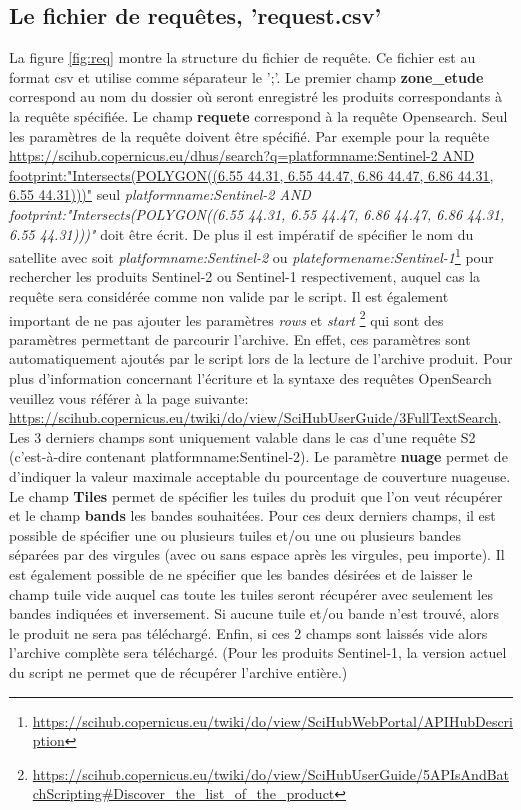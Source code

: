 \documentclass[notitlepage]{report}
\begin{document}
\subsection{Le fichier de requêtes, 'request.csv'}

\sloppypar
La figure \ref{fig:req} montre la structure du fichier de requête. Ce fichier est au format csv et utilise comme séparateur le ';'. Le premier champ \textbf{zone\_etude} correspond au nom du dossier où seront enregistré les produits correspondants à la requête spécifiée. Le champ \textbf{requete} correspond à la requête Opensearch. Seul les paramètres de la requête  doivent être spécifié. Par exemple pour la requête \url{https://scihub.copernicus.eu/dhus/search?q=platformname:Sentinel-2 AND footprint:"Intersects(POLYGON((6.55 44.31, 6.55 44.47, 6.86 44.47, 6.86 44.31, 6.55 44.31)))"} seul \emph{platformname:Sentinel-2 AND footprint:"Intersects(POLYGON((6.55 44.31, 6.55 44.47, 6.86 44.47, 6.86 44.31, 6.55 44.31)))"} doit être écrit. De plus il est impératif de spécifier le nom du satellite avec soit \emph{platformname:Sentinel-2} ou \emph{plateformename:Sentinel-1}\footnote{\url{https://scihub.copernicus.eu/twiki/do/view/SciHubWebPortal/APIHubDescription}} pour rechercher les produits Sentinel-2 ou Sentinel-1 respectivement, auquel cas la requête sera considérée comme non valide par le script. Il est également important de ne pas ajouter les paramètres \emph{rows} et \emph{start}
\footnote{\url{https://scihub.copernicus.eu/twiki/do/view/SciHubUserGuide/5APIsAndBatchScripting\#Discover_the_list_of_the_product}} qui sont des paramètres permettant de parcourir l'archive. En effet, ces paramètres sont automatiquement ajoutés par le script lors de la lecture de l'archive produit. Pour plus d'information concernant l'écriture et la syntaxe des requêtes OpenSearch veuillez vous référer à la page suivante: \url{https://scihub.copernicus.eu/twiki/do/view/SciHubUserGuide/3FullTextSearch}.
Les 3 derniers champs sont uniquement valable dans le cas d'une requête S2 (c'est-à-dire contenant platformname:Sentinel-2). Le paramètre \textbf{nuage} permet de d'indiquer la valeur maximale acceptable du pourcentage de couverture nuageuse. Le champ \textbf{Tiles} permet de spécifier les tuiles du produit que l'on veut récupérer et le champ \textbf{bands} les bandes souhaitées. Pour ces deux derniers champs, il est possible de spécifier une ou plusieurs tuiles et/ou une ou plusieurs bandes séparées par des virgules (avec ou sans espace après les virgules, peu importe). Il est également possible de ne spécifier que les bandes désirées et de laisser le champ tuile vide auquel cas toute les tuiles seront récupérer avec seulement les bandes indiquées et inversement. Si aucune tuile et/ou bande n'est trouvé, alors le produit ne sera pas téléchargé. Enfin, si ces 2 champs sont laissés vide alors l'archive complète sera téléchargé. (Pour les produits Sentinel-1, la version actuel du script ne permet que de récupérer l'archive entière.)
\end{document}
